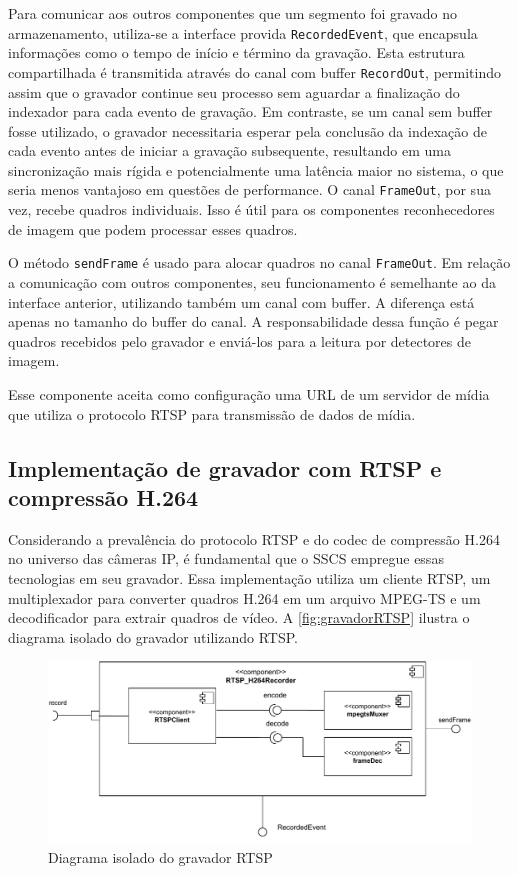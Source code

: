 \documentclass[12pt, %
openright, 
oneside, %
a4paper,    %
brazil]{facom-ufu-abntex2}
\begin{document}
Para comunicar aos outros componentes que um segmento foi gravado no
armazenamento, utiliza-se a interface provida \texttt{RecordedEvent}, que
encapsula informações como o tempo de início e término da gravação. Esta
estrutura compartilhada é transmitida através do canal com buffer
\texttt{RecordOut}, permitindo assim que o gravador continue seu processo sem
aguardar a finalização do indexador para cada evento de gravação. Em contraste,
se um canal sem buffer fosse utilizado, o gravador necessitaria esperar pela
conclusão da indexação de cada evento antes de iniciar a gravação subsequente,
resultando em uma sincronização mais rígida e potencialmente uma latência maior
no sistema, o que seria menos vantajoso em questões de performance. O canal
\texttt{FrameOut}, por sua vez, recebe quadros individuais. Isso é útil para os
componentes reconhecedores de imagem que podem processar esses quadros.

O método \texttt{sendFrame} é usado para alocar quadros no canal
\texttt{FrameOut}. Em relação a comunicação com outros componentes, seu
funcionamento é semelhante ao da interface anterior, utilizando também um canal
com buffer. A diferença está apenas no tamanho do buffer do canal. A
responsabilidade dessa função é pegar quadros recebidos pelo gravador e
enviá-los para a leitura por detectores de imagem.

Esse componente aceita como configuração uma URL de um servidor de mídia que
utiliza o protocolo RTSP para transmissão de dados de mídia.

\subsection{Implementação de gravador com RTSP e compressão H.264}

Considerando a prevalência do protocolo RTSP e do codec de compressão H.264 no
universo das câmeras IP, é fundamental que o SSCS empregue essas tecnologias em
seu gravador. Essa implementação utiliza um cliente RTSP, um multiplexador para
converter quadros H.264 em um arquivo MPEG-TS e um decodificador para extrair
quadros de vídeo. A \autoref{fig:gravadorRTSP} ilustra o diagrama isolado do
gravador utilizando RTSP.

\begin{figure}[!ht]
	\centering
	\includegraphics[width=1\linewidth]{rtsp_h264recorder.pdf}
	\caption[Diagrama isolado do gravador RTSP]{Diagrama isolado do
		gravador RTSP}
	\label{fig:gravadorRTSP}
\end{figure}
\end{document}
